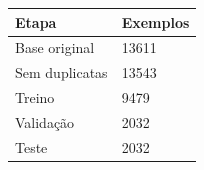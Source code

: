 \begin{tabular}{ll}
\toprule
Etapa & Exemplos \\
\midrule
Base original & 13611 \\
Sem duplicatas & 13543 \\
Treino & 9479 \\
Validação & 2032 \\
Teste & 2032 \\
\bottomrule
\end{tabular}
